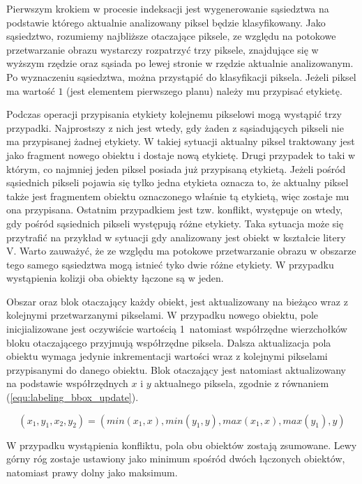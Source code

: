 Pierwszym krokiem w procesie indeksacji jest wygenerowanie sąsiedztwa na podstawie którego aktualnie analizowany piksel będzie klasyfikowany. Jako sąsiedztwo, rozumiemy najbliższe otaczające piksele, ze względu na potokowe przetwarzanie obrazu wystarczy rozpatrzyć trzy piksele, znajdujące się w wyższym rzędzie oraz sąsiada po lewej stronie w rzędzie aktualnie analizowanym. Po wyznaczeniu sąsiedztwa, można przystąpić do klasyfikacji piksela. Jeżeli piksel ma wartość $1$ (jest elementem pierwszego planu) należy mu przypisać etykietę.  

Podczas operacji przypisania etykiety kolejnemu pikselowi mogą wystąpić trzy przypadki. Najprostszy z nich jest wtedy, gdy żaden z sąsiadujących pikseli nie ma przypisanej żadnej etykiety. W takiej sytuacji aktualny piksel traktowany jest jako fragment nowego obiektu i dostaje nową etykietę. Drugi przypadek to taki w którym, co najmniej jeden piksel posiada już przypisaną etykietą. Jeżeli pośród sąsiednich pikseli pojawia się tylko jedna etykieta oznacza to, że aktualny piksel także jest fragmentem obiektu oznaczonego właśnie tą etykietą, więc zostaje mu ona przypisana.
Ostatnim przypadkiem jest tzw. konflikt, występuje on wtedy, gdy pośród sąsiednich pikseli występują różne etykiety. Taka sytuacja może się przytrafić na przykład w sytuacji gdy analizowany jest obiekt w kształcie litery V. Warto zauważyć, że ze względu ma potokowe przetwarzanie obrazu w obszarze tego samego sąsiedztwa mogą istnieć tyko dwie różne etykiety. W przypadku wystąpienia kolizji oba obiekty łączone są w jeden.

Obszar oraz blok otaczający każdy obiekt, jest aktualizowany na bieżąco wraz z kolejnymi przetwarzanymi pikselami. W przypadku nowego obiektu, pole inicjializowane jest oczywiście wartością 1~natomiast współrzędne wierzchołków bloku otaczającego przyjmują współrzędne piksela. Dalsza aktualizacja pola obiektu wymaga jedynie inkrementacji wartości wraz z kolejnymi pikselami przypisanymi do danego obiektu. Blok otaczający jest natomiast aktualizowany na podstawie współrzędnych $x$ i $y$ aktualnego piksela, zgodnie z równaniem (\ref{equ:labeling_bbox_update}). 

    \begin{equation}
        (x_{1}, y_{1}, x_{2}, y_{2})= (min(x_{1}, x), min(y_{1}, y), max(x_{1}, x), max(y_{1}), y)
    \label{equ:labeling_bbox_update}
    \end{equation}

\noindent
W przypadku wystąpienia konfliktu, pola obu obiektów zostają zsumowane. Lewy górny róg zostaje ustawiony jako minimum spośród dwóch łączonych obiektów, natomiast prawy dolny jako maksimum.

